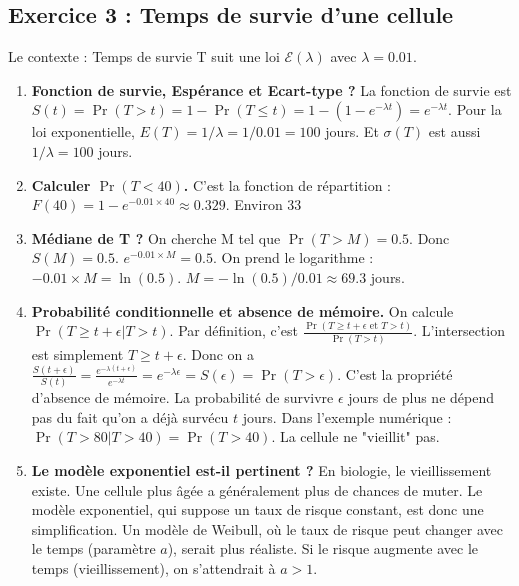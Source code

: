 \documentclass[12pt, a4paper]{article}
\begin{document}
\subsection*{Exercice 3 : Temps de survie d'une cellule}
Le contexte : Temps de survie T suit une loi $\mathcal{E}(\lambda)$ avec $\lambda=0.01$.

\begin{enumerate}
    \item \textbf{Fonction de survie, Espérance et Ecart-type ?}
    La fonction de survie est $S(t) = \Pr(T > t) = 1 - \Pr(T \le t) = 1 - (1 - e^{-\lambda t}) = e^{-\lambda t}$.
    Pour la loi exponentielle, $E(T) = 1/\lambda = 1/0.01 = 100$ jours.
    Et $\sigma(T)$ est aussi $1/\lambda = 100$ jours.

    \item \textbf{Calculer $\Pr(T < 40)$.}
    C'est la fonction de répartition : $F(40) = 1 - e^{-0.01 \times 40} \approx 0.329$. Environ 33%

    \item \textbf{Médiane de T ?}
    On cherche M tel que $\Pr(T > M) = 0.5$. Donc $S(M) = 0.5$.
    $e^{-0.01 \times M} = 0.5$. On prend le logarithme : $-0.01 \times M = \ln(0.5)$.
    $M = -\ln(0.5)/0.01 \approx 69.3$ jours.

    \item \textbf{Probabilité conditionnelle et absence de mémoire.}
    On calcule $\Pr(T \ge t+\epsilon | T > t)$. Par définition, c'est $\frac{\Pr(T \ge t+\epsilon \text{ et } T > t)}{\Pr(T > t)}$.
    L'intersection est simplement $T \ge t+\epsilon$.
    Donc on a $\frac{S(t+\epsilon)}{S(t)} = \frac{e^{-\lambda(t+\epsilon)}}{e^{-\lambda t}} = e^{-\lambda\epsilon} = S(\epsilon) = \Pr(T > \epsilon)$.
    C'est la propriété d'absence de mémoire. La probabilité de survivre $\epsilon$ jours de plus ne dépend pas du fait qu'on a déjà survécu $t$ jours.
    Dans l'exemple numérique : $\Pr(T>80|T>40) = \Pr(T>40)$. La cellule ne "vieillit" pas.

    \item \textbf{Le modèle exponentiel est-il pertinent ?}
    En biologie, le vieillissement existe. Une cellule plus âgée a généralement plus de chances de muter. Le modèle exponentiel, qui suppose un taux de risque constant, est donc une simplification. Un modèle de Weibull, où le taux de risque peut changer avec le temps (paramètre $a$), serait plus réaliste. Si le risque augmente avec le temps (vieillissement), on s'attendrait à $a > 1$.
\end{enumerate}
\end{document}

